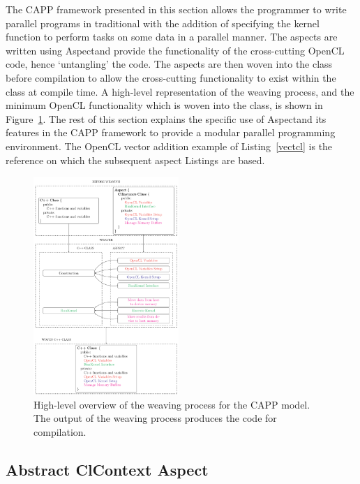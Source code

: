 \documentclass{sig-alternate-05-2015}
\begin{document}
The  CAPP framework presented in this section allows the programmer to
write parallel programs in traditional \CPP with the addition of specifying the kernel
function to perform tasks on some data in a parallel manner. The aspects
are written using Aspect\CPP and provide the functionality of the
cross-cutting OpenCL code, hence `untangling' the \CPP code. The aspects
are then woven into the \CPP class before compilation to allow the cross-cutting
functionality to exist within the \CPP class at compile time. A high-level
representation of the weaving process, and the minimum OpenCL functionality which is
woven into the \CPP class, is shown in Figure~\ref{fig:weaving}. 
The rest of this section explains the specific use of Aspect\CPP and its
features in the  CAPP framework to provide a modular parallel programming
environment. The OpenCL vector addition example of Listing~\ref{vectcl} is the
reference on which the subsequent aspect Listings are based.
\begin{figure}[!t]
	\centering
	\includegraphics[width=0.49\textwidth]{weaving}
	\caption{High-level overview of the weaving process for the CAPP
		model. The output of the weaving process produces the code for
	compilation.}
	\label{fig:weaving}
\end{figure}

\subsection{Abstract ClContext Aspect}
\end{document}
